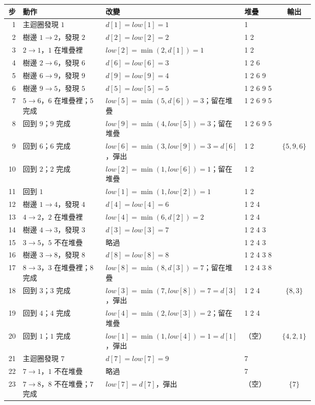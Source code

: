 \begin{center}
\footnotesize
\setlength{\tabcolsep}{3.5pt}
\begin{tabular}{r>{\raggedright\arraybackslash}p{0.27\linewidth}>{\raggedright\arraybackslash}p{0.43\linewidth}lc}
\toprule
步 & 動作 & 改變 & 堆疊 & 輸出 \\
\midrule
1 & 主迴圈發現 $1$ & $d[1]=\mathit{low}[1]=1$ & 1 &  \\
2 & 樹邊 $1\to2$，發現 $2$ & $d[2]=\mathit{low}[2]=2$ & 1 2 &  \\
3 & $2\to1$，$1$ 在堆疊裡 & $\mathit{low}[2]=\min(2,d[1])=1$ & 1 2 &  \\
4 & 樹邊 $2\to6$，發現 $6$ & $d[6]=\mathit{low}[6]=3$ & 1 2 6 &  \\
5 & 樹邊 $6\to9$，發現 $9$ & $d[9]=\mathit{low}[9]=4$ & 1 2 6 9 &  \\
6 & 樹邊 $9\to5$，發現 $5$ & $d[5]=\mathit{low}[5]=5$ & 1 2 6 9 5 &  \\
7 & $5\to6$，$6$ 在堆疊裡；$5$ 完成 & $\mathit{low}[5]=\min(5,d[6])=3$；留在堆疊 & 1 2 6 9 5 &  \\
8 & 回到 $9$；$9$ 完成 & $\mathit{low}[9]=\min(4,\mathit{low}[5])=3$；留在堆疊 & 1 2 6 9 5 &  \\
9 & 回到 $6$；$6$ 完成 & $\mathit{low}[6]=\min(3,\mathit{low}[9])=3=d[6]$，彈出 & 1 2 & $\{5,9,6\}$ \\
10 & 回到 $2$；$2$ 完成 & $\mathit{low}[2]=\min(1,\mathit{low}[6])=1$；留在堆疊 & 1 2 &  \\
11 & 回到 $1$ & $\mathit{low}[1]=\min(1,\mathit{low}[2])=1$ & 1 2 &  \\
12 & 樹邊 $1\to4$，發現 $4$ & $d[4]=\mathit{low}[4]=6$ & 1 2 4 &  \\
13 & $4\to2$，$2$ 在堆疊裡 & $\mathit{low}[4]=\min(6,d[2])=2$ & 1 2 4 &  \\
14 & 樹邊 $4\to3$，發現 $3$ & $d[3]=\mathit{low}[3]=7$ & 1 2 4 3 &  \\
15 & $3\to5$，$5$ 不在堆疊 & 略過 & 1 2 4 3 &  \\
16 & 樹邊 $3\to8$，發現 $8$ & $d[8]=\mathit{low}[8]=8$ & 1 2 4 3 8 &  \\
17 & $8\to3$，$3$ 在堆疊裡；$8$ 完成 & $\mathit{low}[8]=\min(8,d[3])=7$；留在堆疊 & 1 2 4 3 8 &  \\
18 & 回到 $3$；$3$ 完成 & $\mathit{low}[3]=\min(7,\mathit{low}[8])=7=d[3]$，彈出 & 1 2 4 & $\{8,3\}$ \\
19 & 回到 $4$；$4$ 完成 & $\mathit{low}[4]=\min(2,\mathit{low}[3])=2$；留在堆疊 & 1 2 4 &  \\
20 & 回到 $1$；$1$ 完成 & $\mathit{low}[1]=\min(1,\mathit{low}[4])=1=d[1]$，彈出 & （空） & $\{4,2,1\}$ \\
21 & 主迴圈發現 $7$ & $d[7]=\mathit{low}[7]=9$ & 7 &  \\
22 & $7\to1$，$1$ 不在堆疊 & 略過 & 7 &  \\
23 & $7\to8$，$8$ 不在堆疊；$7$ 完成 & $\mathit{low}[7]=d[7]$，彈出 & （空） & $\{7\}$ \\
\bottomrule
\end{tabular}
\end{center}

